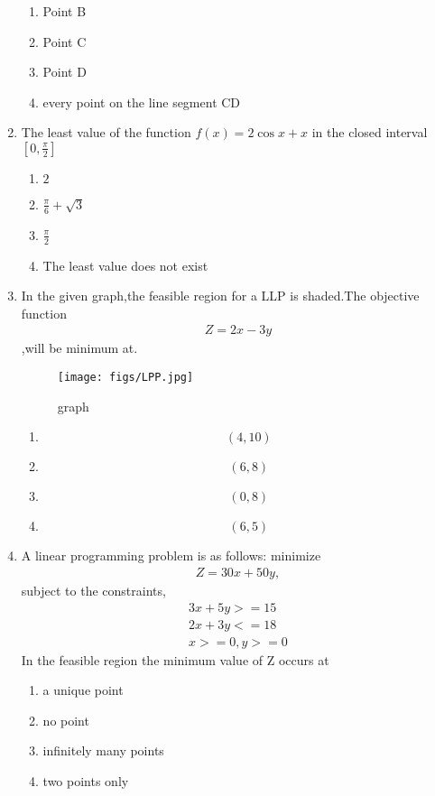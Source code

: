 \documentclass{article}
\begin{document}
\begin{enumerate}
\begin{enumerate}[label=(\Alph*)]
			\item Point B
			\item Point C
			\item Point D
			\item every point on the line segment CD
		\end{enumerate}
	\item The least value of the function {$f(x) = 2\cos x + x$} in the closed interval$[0,\frac{\pi}{2}]$
		\begin{enumerate}[label=(\Alph*)]
			\item $2$
			\item $\frac{\pi}{6}+\sqrt{3}$
			\item $\frac{\pi}{2}$
			\item The least value does not exist
		\end{enumerate}
	\item In the given graph,the feasible region for a LLP is shaded.The objective function 
	\begin{align}
		 Z = 2x-3y
	\end{align}
		,will be minimum at.
		\begin{figure}[H]
		\centering
			\texttt{[image: figs/LPP.jpg]}
			\caption{graph}
			\label{fig:LPP.jpg}
		\end{figure}
		\begin{enumerate}%
			\item $$(4,10)$$
			\item $$(6,8)$$
			\item $$(0,8)$$
			\item $$(6,5)$$
		\end{enumerate}
	\item A linear programming problem is as follows:
		minimize 
	\begin{align}
		  Z = 30x+50y,
	\end{align}
		subject to the constraints,
	\begin{align}
		  3x+5y>=15\\
		 2x+3y<=18\\
		 x>=0,y>=0
	\end{align}
		In the feasible region the minimum value of Z occurs at
		\begin{enumerate}[label = (\Alph*)]
			\item a unique point
			\item no point
			\item infinitely many points
			\item two points only

\end{enumerate}
\end{enumerate}
\end{document}
